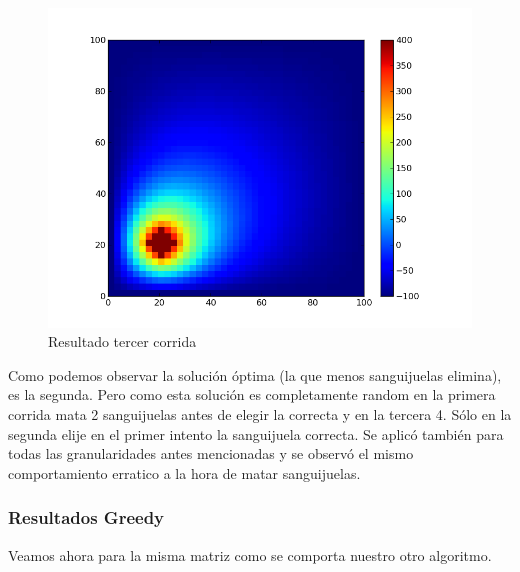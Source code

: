 \begin{figure}[htb]
\begin{center}
\includegraphics[scale=0.3]{imagenes/random_3.png} 
\caption{Resultado tercer corrida} 
\end{center}
\end{figure}
Como podemos observar la solución óptima (la que menos sanguijuelas elimina), es la segunda. Pero como esta solución es completamente random en la primera corrida mata 2 sanguijuelas antes de elegir 
la correcta y en la tercera 4. Sólo en la segunda elije en el primer intento la sanguijuela correcta. Se aplicó también para todas las granularidades antes mencionadas y se observó el mismo comportamiento erratico a la hora
de matar sanguijuelas. 

\clearpage


\subsubsection{Resultados Greedy}

Veamos ahora para la misma matriz como se comporta nuestro otro algoritmo. 


